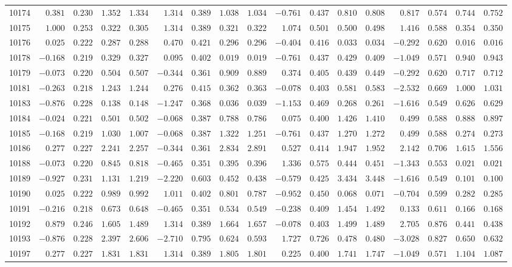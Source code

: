 \begin{landscape}
{\begin{longtable}{l|rrrr|rrrr|rrrr|rrrr}
10174&$ 0.381$&$0.230$&$1.352$&$1.334$&$ 1.314$&$0.389$&$1.038$&$1.034$&$-0.761$&$0.437$&$0.810$&$0.808$&$ 0.817$&$0.574$&$0.744$&$0.752$\tabularnewline
10175&$ 1.000$&$0.253$&$0.322$&$0.305$&$ 1.314$&$0.389$&$0.321$&$0.322$&$ 1.074$&$0.501$&$0.500$&$0.498$&$ 1.416$&$0.588$&$0.354$&$0.350$\tabularnewline
10176&$ 0.025$&$0.222$&$0.287$&$0.288$&$ 0.470$&$0.421$&$0.296$&$0.296$&$-0.404$&$0.416$&$0.033$&$0.034$&$-0.292$&$0.620$&$0.016$&$0.016$\tabularnewline
10178&$-0.168$&$0.219$&$0.329$&$0.327$&$ 0.095$&$0.402$&$0.019$&$0.019$&$-0.761$&$0.437$&$0.429$&$0.409$&$-1.049$&$0.571$&$0.940$&$0.943$\tabularnewline
10179&$-0.073$&$0.220$&$0.504$&$0.507$&$-0.344$&$0.361$&$0.909$&$0.889$&$ 0.374$&$0.405$&$0.439$&$0.449$&$-0.292$&$0.620$&$0.717$&$0.712$\tabularnewline
10181&$-0.263$&$0.218$&$1.243$&$1.244$&$ 0.276$&$0.415$&$0.362$&$0.363$&$-0.078$&$0.403$&$0.581$&$0.583$&$-2.532$&$0.669$&$1.000$&$1.031$\tabularnewline
10183&$-0.876$&$0.228$&$0.138$&$0.148$&$-1.247$&$0.368$&$0.036$&$0.039$&$-1.153$&$0.469$&$0.268$&$0.261$&$-1.616$&$0.549$&$0.626$&$0.629$\tabularnewline
10184&$-0.024$&$0.221$&$0.501$&$0.502$&$-0.068$&$0.387$&$0.788$&$0.786$&$ 0.075$&$0.400$&$1.426$&$1.410$&$ 0.499$&$0.588$&$0.888$&$0.897$\tabularnewline
10185&$-0.168$&$0.219$&$1.030$&$1.007$&$-0.068$&$0.387$&$1.322$&$1.251$&$-0.761$&$0.437$&$1.270$&$1.272$&$ 0.499$&$0.588$&$0.274$&$0.273$\tabularnewline
10186&$ 0.277$&$0.227$&$2.241$&$2.257$&$-0.344$&$0.361$&$2.834$&$2.891$&$ 0.527$&$0.414$&$1.947$&$1.952$&$ 2.142$&$0.706$&$1.615$&$1.556$\tabularnewline
10188&$-0.073$&$0.220$&$0.845$&$0.818$&$-0.465$&$0.351$&$0.395$&$0.396$&$ 1.336$&$0.575$&$0.444$&$0.451$&$-1.343$&$0.553$&$0.021$&$0.021$\tabularnewline
10189&$-0.927$&$0.231$&$1.131$&$1.219$&$-2.220$&$0.603$&$0.452$&$0.438$&$-0.579$&$0.425$&$3.434$&$3.448$&$-1.616$&$0.549$&$0.101$&$0.100$\tabularnewline
10190&$ 0.025$&$0.222$&$0.989$&$0.992$&$ 1.011$&$0.402$&$0.801$&$0.787$&$-0.952$&$0.450$&$0.068$&$0.071$&$-0.704$&$0.599$&$0.282$&$0.285$\tabularnewline
10191&$-0.216$&$0.218$&$0.673$&$0.648$&$-0.465$&$0.351$&$0.534$&$0.549$&$-0.238$&$0.409$&$1.454$&$1.492$&$ 0.133$&$0.611$&$0.166$&$0.168$\tabularnewline
10192&$ 0.879$&$0.246$&$1.605$&$1.489$&$ 1.314$&$0.389$&$1.664$&$1.657$&$-0.078$&$0.403$&$1.499$&$1.489$&$ 2.705$&$0.876$&$0.441$&$0.438$\tabularnewline
10193&$-0.876$&$0.228$&$2.397$&$2.606$&$-2.710$&$0.795$&$0.624$&$0.593$&$ 1.727$&$0.726$&$0.478$&$0.480$&$-3.028$&$0.827$&$0.650$&$0.632$\tabularnewline
10197&$ 0.277$&$0.227$&$1.831$&$1.831$&$ 1.314$&$0.389$&$1.805$&$1.801$&$ 0.225$&$0.400$&$1.741$&$1.747$&$-1.049$&$0.571$&$1.104$&$1.087$\tabularnewline

\end{longtable}}
\end{landscape}
